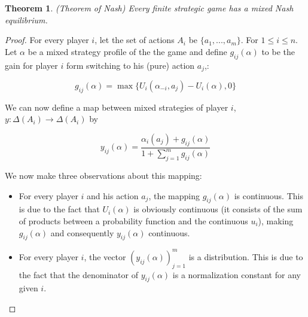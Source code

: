 \documentclass[a4paper,11pt]{article}
\newtheorem{theorem}{Theorem}[section]
\begin{document}
\begin{theorem}(Theorem of Nash)
Every finite strategic game has a mixed Nash equilibrium.
\end{theorem}

\begin{proof}
For every player $i$, let the set of actions $A_i$ be $\{a_{1}, ..., a_{m}\}$. For $1\leq i\leq n$. Let $\alpha$ be a mixed strategy profile of the the game and define $g_{ij}(\alpha)$ to be the gain for player $i$ form switching to his (pure) action $a_{j}$,:

$$g_{ij}(\alpha) = \max\{U_i(\alpha_{-i}, a_{j}) - U_i(\alpha),0\}$$

We can now define a map between mixed strategies of player $i$, $y:\Delta(A_i)\rightarrow \Delta(A_i)$ by

$$y_{ij}(\alpha) = \frac{\alpha_{i}(a_j)+g_{ij}(\alpha)}{1+\sum_{j=1}^{m}{g_{ij}(\alpha)}}$$

We now make three observations about this mapping:

\begin{itemize}
  \item For every player $i$ and his action $a_{j}$, the mapping $g_{ij}(\alpha)$ is continuous. This is due to the fact that $U_i(\alpha)$ is obviously continuous (it consists of the sum of products between a probability function and the continuous $u_i$), making $g_{ij}(\alpha)$ and consequently $y_{ij}(\alpha)$ continuous.

  \item For every player $i$, the vector $(y_{ij}(\alpha))_{j=1}^{m}$ is a distribution. This is due to the fact that the denominator of $y_{ij}(\alpha)$ is a normalization constant for any given $i$.



\end{itemize}
\end{proof}
\end{document}
